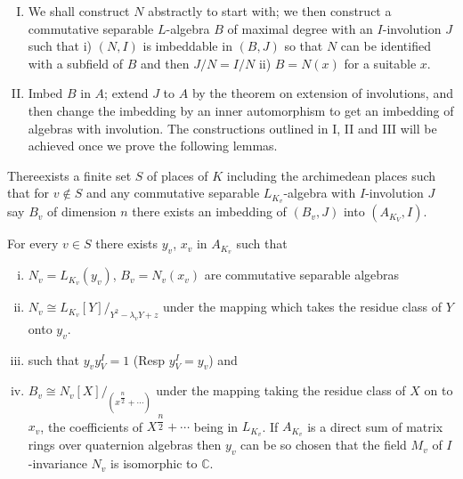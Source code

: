 \begin{enumerate}[I)]
\item We shall construct $N$ abstractly to start with; we then
  construct a commutative separable $L$-algebra $B$ of maximal degree
  with an $I$-involution $J$ such that i) $(N, I)$ is imbeddable in
  $(B,J)$ so that $N$ can be identified with a subfield of $B$ and
  then $J/N = I/N$ ii) $B= N (x)$ for a suitable $x$. 

\item Imbed $B$ in $A$; extend $J$ to $A$ by the theorem on extension
  of involutions, and then change the imbedding by an inner
  automorphism  to get an imbedding of algebras with involution. The
  constructions outlined in I, II  and III will be achieved once
  we prove the following lemmas. 
\end{enumerate}


\setcounter{lem}{0}
\begin{lem}\label{chap5:s5.7:lem1} %
There\pageoriginale exists  a finite set $S$ of places of $K$ including the
archi\-me\-dean places such that for $ v \notin S$ and any commutative
separable $L_{K_{v}}$-algebra with  $I$-involution $J$ say $B_v$ of
dimension  $n$ there exists an imbedding of $(B_v,J)$ into
$(A_{K_{V}},I)$. 
\end{lem}

\begin{lem}\label{chap5:s5.7:lem2}%
For every $v \in S$ there exists $y_v$, $x_v$ in $A_{K_{v}}$  such
that  
\begin{enumerate}[i)]
\item $N_v = L_{K_{v}} (y_v)$, $B_v = N_v (x_v)$ are commutative
  separable algebras  

\item  $N_v \cong L_{K_{v}}[Y]/_{Y^2 - \lambda_v Y + z}$ under the
  mapping which takes the residue class of $Y$ onto $y_v$. 

\item such that $y_v y^I_V = 1$  (Resp $y^I_V = y_v$) and  

\item  $B_v \cong N_v[X]/_{(x^{\dfrac{n}{2}} + \cdots)}$ under the
  mapping taking the residue class of $X$ on to $x_v$, the
  coefficients of $X^{\dfrac{n}{2}} + \cdots$ being in $L_{K_{v}}$. If
  $A_{K_{v}}$ is a direct sum of matrix rings over quaternion algebras
  then  $y_v$ can be so chosen  that the field  $M_v$ of
  $I$-invariance $N_v$ is isomorphic to $\mathbb{C}$. 
\end{enumerate} 
\end{lem}

